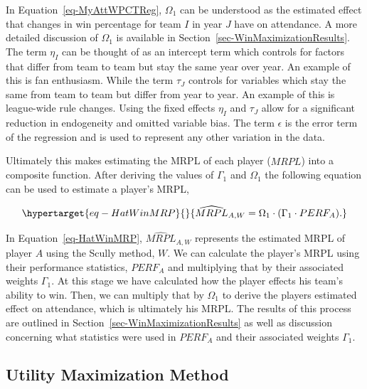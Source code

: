 \documentclass[
  12pt,
  letterpaper,
  DIV=11,
  numbers=noendperiod]{scrartcl}
\begin{document}
In Equation~\ref{eq-MyAttWPCTReg}, \(\Omega_1\) can be understood as the
estimated effect that changes in win percentage for team \(I\) in year
\(J\) have on attendance. A more detailed discussion of \(\Omega_1\) is
available in Section~\ref{sec-WinMaximizationResults}. The term
\(\eta_I\) can be thought of as an intercept term which controls for
factors that differ from team to team but stay the same year over year.
An example of this is fan enthusiasm. While the term \(\tau_J\) controls
for variables which stay the same from team to team but differ from year
to year. An example of this is league-wide rule changes. Using the fixed
effects \(\eta_I\) and \(\tau_J\) allow for a significant reduction in
endogeneity and omitted variable bias. The term \(\epsilon\) is the
error term of the regression and is used to represent any other
variation in the data.

Ultimately this makes estimating the MRPL of each player
(\(\widehat{MRPL}\)) into a composite function. After deriving the
values of \(\Gamma_1\) and \(\Omega_1\) the following equation can be
used to estimate a player's MRPL,

\begin{equation}\protect\hypertarget{eq-HatWinMRP}{}{
\widehat{MRPL}_{A,W}=\Omega_1\cdot(\Gamma_1\cdot PERF_A).
}\label{eq-HatWinMRP}\end{equation}

In Equation~\ref{eq-HatWinMRP}, \(\widehat{MRPL}_{A,W}\) represents the
estimated MRPL of player \(A\) using the Scully method, \(W\). We can
calculate the player's MRPL using their performance statistics,
\(PERF_A\) and multiplying that by their associated weights
\(\Gamma_1\). At this stage we have calculated how the player effects
his team's ability to win. Then, we can multiply that by \(\Omega_1\) to
derive the players estimated effect on attendance, which is ultimately
his MRPL. The results of this process are outlined in
Section~\ref{sec-WinMaximizationResults} as well as discussion
concerning what statistics were used in \(PERF_A\) and their associated
weights \(\Gamma_1\).

\hypertarget{sec-UtilityMethod}{%
\subsection{Utility Maximization Method}\label{sec-UtilityMethod}}
\end{document}
